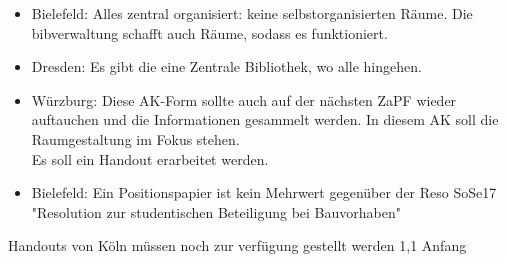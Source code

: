     \begin{itemize}
      \item Bielefeld: Alles zentral organisiert: keine selbstorganisierten Räume. Die bibverwaltung schafft auch Räume, sodass es funktioniert.

      \item Dresden: Es gibt die eine Zentrale Bibliothek, wo alle hingehen.

      \item Würzburg: Diese AK-Form sollte auch auf der nächsten ZaPF wieder auftauchen und die Informationen gesammelt werden.
      In diesem AK soll die Raumgestaltung im Fokus stehen. \\

      Es soll ein Handout erarbeitet werden.

      \item Bielefeld: Ein Positionspapier ist kein Mehrwert gegenüber der Reso SoSe17 "Resolution zur studentischen Beteiligung bei Bauvorhaben"

    \end{itemize}

   Handouts von Köln müssen noch zur verfügung gestellt werden
                                                                                                                               1,1        Anfang
